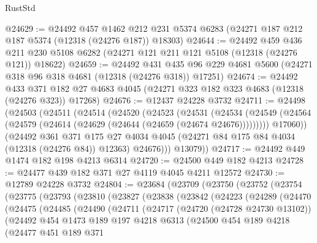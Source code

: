 \begin{lexlean}{RustStd}
\begin{coremodule}
@24629 := @24492
    @457
    @1462
    @212
    @231
    @5374
    @6283
    (@24271 @187 @212 @187 @5374 (@12318 (@24276 @187)) @18303)
@24644 := @24492
    @459
    @436
    @211
    @230
    @5108
    @6282
    (@24271 @121 @211 @121 @5108 (@12318 (@24276 @121)) @18622)
@24659 := @24492
    @431
    @435
    @96
    @229
    @4681
    @5600
    (@24271 @318 @96 @318 @4681 (@12318 (@24276 @318)) @17251)
@24674 := @24492
    @433
    @371
    @182
    @27
    @4683
    @4045
    (@24271 @323 @182 @323 @4683 (@12318 (@24276 @323)) @17268)
@24676 := @12437 @24228 @3732
@24711 := @24498
    (@24503
      (@24511
        (@24514
          (@24520
            (@24523
              (@24531
                (@24534
                  (@24549 (@24564 (@24579 (@24614 (@24629 (@24644 (@24659 (@24674 @24676)))))))))
                @17060))
            (@24492
              @361
              @371
              @175
              @27
              @4034
              @4045
              (@24271 @84 @175 @84 @4034 (@12318 (@24276 @84)) @12363)
              @24676)))
        @13079))
@24717 := @24492 @449 @1474 @182 @198 @4213 @6314
@24720 := @24500 @449 @182 @4213
@24728 := @24477 @439 @182 @371 @27 @4119 @4045 @4211 @12572
@24730 := @12789 @24228 @3732
@24804 := @23684
    (@23709
      (@23750
        (@23752
          (@23754
            (@23775
              (@23793
                (@23810
                  (@23827
                    (@23838
                      (@23842
                        (@24223
                          (@24289
                            (@24470
                              (@24475
                                (@24485
                                  (@24490
                                    (@24711
                                      (@24717
                                        (@24720 (@24728 @24730 @13102))
                                        (@24492
                                          @454
                                          @1473
                                          @189
                                          @197
                                          @4218
                                          @6313
                                          (@24500
                                            @454
                                            @189
                                            @4218
                                            (@24477
                                              @451
                                              @189
                                              @371

\end{coremodule}
\end{lexlean}
